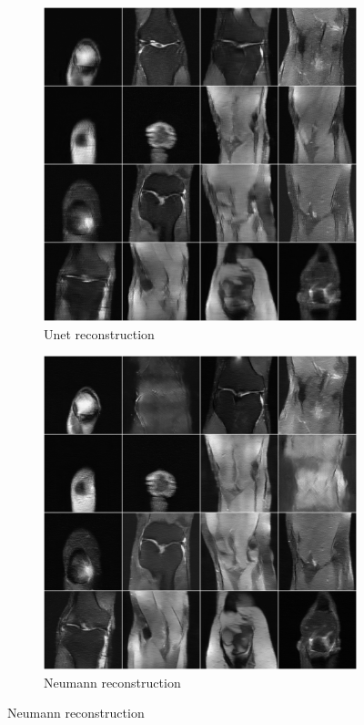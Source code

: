 \documentclass{article}
\begin{document}
\newpage
\begin{figure}[H] 
\centering
   \begin{subfigure}[]{.5\textwidth}
   \centering
        \includegraphics[width=.95\linewidth]{Unet_reconstruction}
	\caption{Unet reconstruction}
	\vspace*{2mm} 
    \end{subfigure}%
   \begin{subfigure}[]{.5\textwidth}
   \centering
        \includegraphics[width=.95\linewidth]{neumann_reconstruction}
	\caption{Neumann reconstruction}
	\vspace*{2mm}
    \end{subfigure}%
\end{figure}
\end{document}

